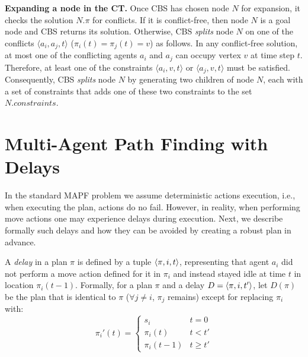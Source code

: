 \documentclass{article}
\begin{document}

{\bf Expanding a node in the CT.} Once CBS has chosen node $N$ for expansion,
it checks the solution $N.\pi$ for conflicts. If it is conflict-free, then node $N$ is a goal node and CBS returns its solution. Otherwise, CBS {\em splits} node $N$ on one of the conflicts $\langle a_i,a_j,t \rangle$ ($\pi_i(t)=\pi_j(t)=v$) as follows. In any conflict-free solution, at most one of the conflicting agents $a_i$ and $a_j$ can occupy vertex $v$ at time step $t$. Therefore, at least one of the constraints $\langle a_i,v,t \rangle$ or $\langle a_j,v,t \rangle$ must be satisfied. Consequently, CBS {\em splits} node $N$ by generating two children of node $N$, each with a set of constraints that adds one of these two constraints to the set $N.constraints$. 






\section{Multi-Agent Path Finding with Delays}

In the standard MAPF problem we assume deterministic actions execution, i.e., when executing the plan, actions do no fail. However, in reality, when performing move actions one may experience delays during execution. Next, we describe formally such delays and how they can be avoided by creating a robust plan in advance.

A \emph{delay} in a plan $\pi$ is defined by a tuple $\left \langle \pi,i,t \right \rangle $,  
representing that agent $a_i$ did not perform a move action defined for it in $\pi_i$ and instead stayed idle at time $t$ in location $\pi_i(t-1)$.  
Formally, for a plan $\pi$ and 
a delay $D=\left \langle \pi,i,t' \right \rangle $,
let $D(\pi)$ be the plan 
that is identical to $\pi$ ($\forall j \neq i$, $\pi_j$ remains) except 
for replacing $\pi_i$ with: 
\[\pi_i'(t)=
 \begin{cases} 
      s_i & t=0 \\
      \pi_i(t) & t<t' \\
      \pi_i(t-1) & t \geq t'
   \end{cases}\]
   
\end{document}
